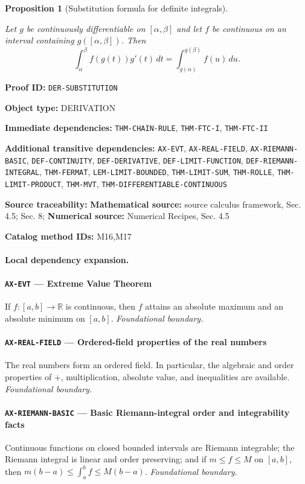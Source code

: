 \documentclass[10pt]{article}
\newcommand{\pidraw}[1]{\begingroup\urlstyle{tt}\nolinkurl{#1}\endgroup}
\newtheorem{proposition}[theorem]{Proposition}
\theoremstyle{definition}
\theoremstyle{remark}
\newcommand{\meta}[2]{\noindent\textbf{#1:} #2\par}
\begin{document}
\begin{proposition}[Substitution formula for definite integrals]\label{prf:DER-SUBSTITUTION}

Let $g$ be continuously differentiable on $[\alpha,\beta]$ and let $f$ be continuous on an interval containing $g([\alpha,\beta])$. Then
\[
\int_\alpha^\beta f(g(t))g'(t)\,dt
=
\int_{g(\alpha)}^{g(\beta)} f(u)\,du.
\]

\end{proposition}

\meta{Proof ID}{\pidraw{DER-SUBSTITUTION}}
\meta{Object type}{DERIVATION}
\meta{Immediate dependencies}{\pidraw{THM-CHAIN-RULE}, \pidraw{THM-FTC-I}, \pidraw{THM-FTC-II}}
\meta{Additional transitive dependencies}{\pidraw{AX-EVT}, \pidraw{AX-REAL-FIELD}, \pidraw{AX-RIEMANN-BASIC}, \pidraw{DEF-CONTINUITY}, \pidraw{DEF-DERIVATIVE}, \pidraw{DEF-LIMIT-FUNCTION}, \pidraw{DEF-RIEMANN-INTEGRAL}, \pidraw{THM-FERMAT}, \pidraw{LEM-LIMIT-BOUNDED}, \pidraw{THM-LIMIT-SUM}, \pidraw{THM-ROLLE}, \pidraw{THM-LIMIT-PRODUCT}, \pidraw{THM-MVT}, \pidraw{THM-DIFFERENTIABLE-CONTINUOUS}}
\meta{Source traceability}{\textbf{Mathematical source:} source calculus framework, Sec. 4.5; Sec. 8; \textbf{Numerical source:} Numerical Recipes, Sec. 4.5}
\meta{Catalog method IDs}{M16,M17}

\paragraph{Local dependency expansion.}

\paragraph{\pidraw{AX-EVT} --- Extreme Value Theorem}
If $f:[a,b]\to\mathbb{R}$ is continuous, then $f$ attains an absolute maximum and an absolute minimum on $[a,b]$.
\textit{Foundational boundary.}

\paragraph{\pidraw{AX-REAL-FIELD} --- Ordered-field properties of the real numbers}
The real numbers form an ordered field. In particular, the algebraic and order properties of $+$, multiplication, absolute value, and inequalities are available.
\textit{Foundational boundary.}

\paragraph{\pidraw{AX-RIEMANN-BASIC} --- Basic Riemann-integral order and integrability facts}
Continuous functions on closed bounded intervals are Riemann integrable; the Riemann integral is linear and order preserving; and if $m\le f\le M$ on $[a,b]$, then $m(b-a)\le\int_a^b f\le M(b-a)$.
\textit{Foundational boundary.}
\end{document}
